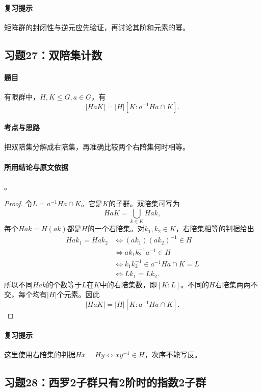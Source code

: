 \paragraph{复习提示}
矩阵群的封闭性与逆元应先验证，再讨论其阶和元素的幂。


\subsection{习题27：\texorpdfstring{双陪集计数}{双陪集计数}}
\label{ex:2:27}

\paragraph{题目}
有限群中，$H,K\leq G,a\in G$，有
\[
|HaK|=|H|[K:a^{-1}Ha\cap K].
\]

\paragraph{考点与思路}
把双陪集分解成右陪集，再准确比较两个右陪集何时相等。

\paragraph{所用结论与原文依据}
。


\begin{proof}
令$L=a^{-1}Ha\cap K$。它是$K$的子群。双陪集可写为
\[
HaK=\bigcup_{k\in K}Hak,
\]
每个$Hak=H(ak)$都是$H$的一个右陪集。对$k_1,k_2\in K$，右陪集相等的判据给出
\begin{align*}
Hak_1=Hak_2
&\iff (ak_1)(ak_2)^{-1}\in H\\
&\iff ak_1k_2^{-1}a^{-1}\in H\\
&\iff k_1k_2^{-1}\in a^{-1}Ha\cap K=L\\
&\iff Lk_1=Lk_2.
\end{align*}
所以不同$Hak$的个数等于$L$在$K$中的右陪集数，即$[K:L]$。不同的$H$右陪集两两不交，每个均有$|H|$个元素。因此
\[
|HaK|=|H|[K:a^{-1}Ha\cap K].
\]
\end{proof}

\paragraph{复习提示}
这里使用右陪集的判据$Hx=Hy\iff xy^{-1}\in H$，次序不能写反。


\subsection{习题28：\texorpdfstring{西罗2子群只有2阶时的指数2子群}{西罗2子群只有2阶时的指数2子群}}
\label{ex:2:28}

